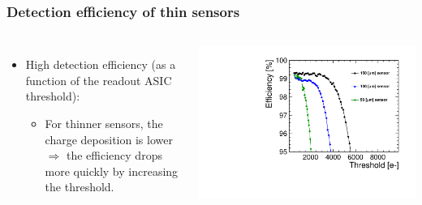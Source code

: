 \begin{frame}
  \frametitle{Detection efficiency of thin sensors}

  \begin{columns}
    \begin{itemize}
    \item High detection efficiency (as a function of the readout ASIC
      threshold):
      \begin{itemize}
      \item For thinner sensors, the charge deposition is lower
        $\Rightarrow$ the efficiency drops more quickly by increasing
        the threshold.
      \end{itemize}
    \end{itemize}

    \centering
    \includegraphics[width=\textwidth]{../figures/TestBeam/Efficiency_vs_THL_zoom.pdf}
  \end{columns}



\end{frame}
